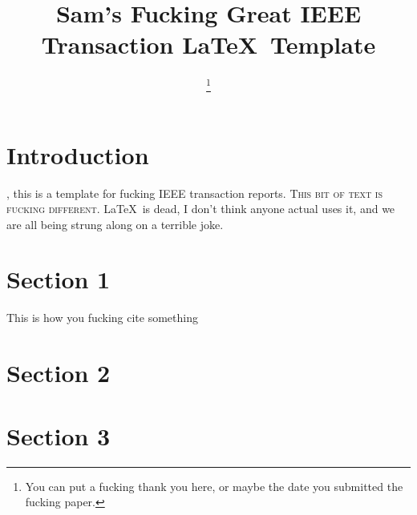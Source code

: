 \documentclass[journal,transmag]{IEEEtran}
\begin{document}
\title{Sam's Fucking Great IEEE Transaction \LaTeX\ Template}

\author{

\thanks{You can put a fucking thank you here, or maybe the date you submitted the fucking paper.}}




\maketitle

\IEEEdisplaynontitleabstractindextext

\IEEEpeerreviewmaketitle

\section{Introduction}
 
, this is a template for fucking IEEE transaction reports. \textsc{This bit of text is fucking different.} \LaTeX\ is dead, I don't think anyone actual uses it, and we are all being strung along on a terrible joke.

\section{Section 1}
	\lipsum[1-2]
	This is how you fucking cite something \cite{mrx05}
	
\section{Section 2}
	\lipsum[3-5]

\section{Section 3}
	\lipsum[6-8]
\end{document}
